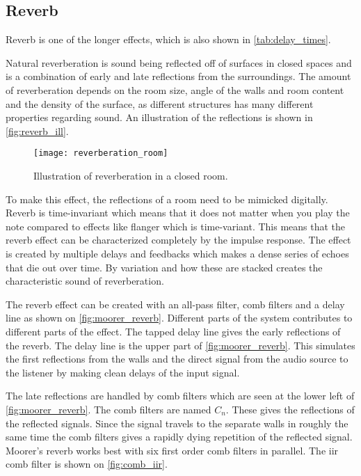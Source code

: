 \subsection{Reverb}
\label{subs:reverb_analysis}

Reverb is one of the longer effects, which is also shown in \autoref{tab:delay_times}. 

Natural reverberation is sound being reflected off of surfaces in closed spaces and is a combination of early and late reflections from the surroundings. The amount of reverberation depends on the room size, angle of the walls and room content and the density of the surface, as different structures has many different properties regarding sound. An illustration of the reflections is shown in \autoref{fig:reverb_ill}.

\begin{figure}[htbp]
	\centering
	\texttt{[image: reverberation\_room]}
	\caption{Illustration of reverberation in a closed room.}
	\label{fig:reverb_ill}
\end{figure}

To make this effect, the reflections of a room need to be mimicked digitally. Reverb is time-invariant which means that it does not matter when you play the note compared to effects like flanger which is time-variant. This means that the reverb effect can be characterized completely by the impulse response. The effect is created by multiple delays and feedbacks which makes a dense series of echoes that die out over time. By variation and how these are stacked creates the characteristic sound of reverberation. 

The reverb effect can be created with an all-pass filter, comb filters and a delay line as shown on  \autoref{fig:moorer_reverb}. Different parts of the system contributes to different parts of the effect. 
The tapped delay line gives the early reflections of the reverb. The delay line is the upper part of \autoref{fig:moorer_reverb}. This simulates the first reflections from the walls and the direct signal from the audio source to the listener by making clean delays of the input signal. 

The late reflections are handled by comb filters which are seen at the lower left of \autoref{fig:moorer_reverb}. The comb filters are named $C_n$. These gives the reflections of the reflected signals. Since the signal travels to the separate walls in roughly the same time the comb filters gives a rapidly dying repetition of the reflected signal. Moorer's reverb works best with six first order comb filters in parallel. The \gls{iir} comb filter is shown on \autoref{fig:comb_iir}.

